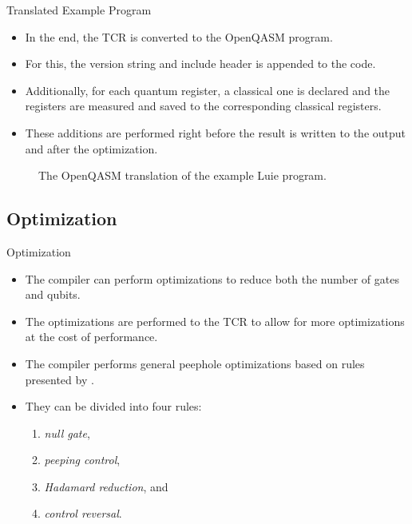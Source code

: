 \begin{frame}{Translated Example Program}    
    \begin{minipage}{.45\textwidth}
        \begin{itemize}
            \item In the end, the TCR is converted to the OpenQASM program.
            \item For this, the version string and include header is appended to the code.
            \item Additionally, for each quantum register, a classical one is declared and the registers are measured and saved to the corresponding classical registers. 
            \item These additions are performed right before the result is written to the output and after the optimization.
        \end{itemize}
    \end{minipage}
    \hfill
    \begin{minipage}{.50\textwidth}
        \centering
        \vfill
        \begin{figure}
            \centering
            
            \caption{The OpenQASM translation of the example Luie program.}
        \end{figure}
        \vfill
    \end{minipage}
\end{frame}

\subsection{Optimization}
\begin{frame}{Optimization}
    \begin{itemize}
        \item The compiler can perform optimizations to reduce both the number of gates and qubits.
        \item The optimizations are performed to the TCR to allow for more optimizations at the cost of performance.
        \item The compiler performs general peephole optimizations based on rules presented by \cite{GaCh11}.
        \item They can be divided into four rules:
        \begin{enumerate}
            \item \emph{null gate}, 
            \item \emph{peeping control}, 
            \item \emph{Hadamard reduction}, and
            \item \emph{control reversal}. 
        \end{enumerate}
    \end{itemize}
\end{frame}


